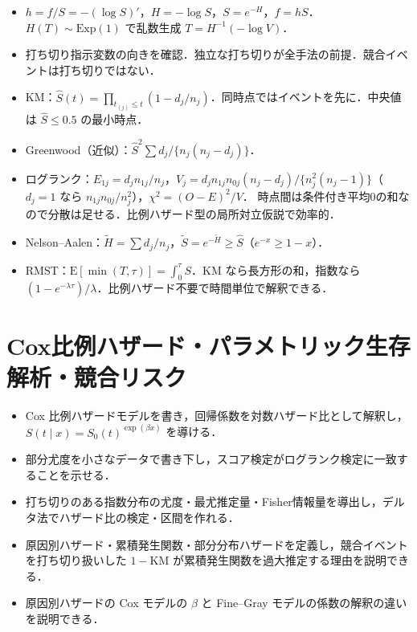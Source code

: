 \documentclass[a4paper,11pt,openany]{ltjsbook}
\newcommand{\E}{\mathrm{E}}
\newcommand{\Ex}{\mathrm{Exp}}
\begin{document}
\begin{summarybox}
\begin{itemize}
\item $h=f/S=-(\log S)'$，$H=-\log S$，$S=e^{-H}$，$f=hS$．$H(T)\sim\Ex(1)$ で乱数生成 $T=H^{-1}(-\log V)$．
\item 打ち切り指示変数の向きを確認．独立な打ち切りが全手法の前提．競合イベントは打ち切りではない．
\item KM：$\hat S(t)=\prod_{t_{(j)}\le t}(1-d_j/n_j)$．同時点ではイベントを先に．中央値は $\hat S\le0.5$ の最小時点．
\item Greenwood（近似）：$\hat S^2\sum d_j/\{n_j(n_j-d_j)\}$．
\item ログランク：$E_{1j}=d_jn_{1j}/n_j$，$V_j=d_jn_{1j}n_{0j}(n_j-d_j)/\{n_j^2(n_j-1)\}$（$d_j=1$ なら $n_{1j}n_{0j}/n_j^2$），$\chi^2=(O-E)^2/V$．
      時点間は条件付き平均0の和なので分散は足せる．比例ハザード型の局所対立仮説で効率的．
\item Nelson--Aalen：$\tilde H=\sum d_j/n_j$，$\tilde S=e^{-\tilde H}\ge\hat S$（$e^{-x}\ge1-x$）．
\item RMST：$\E[\min(T,\tau)]=\int_0^\tau S$．KM なら長方形の和，指数なら $(1-e^{-\lambda\tau})/\lambda$．比例ハザード不要で時間単位で解釈できる．
\end{itemize}
\end{summarybox}

\chapter[Cox比例ハザード・パラメトリック生存解析・競合リスク]{Cox比例ハザード・パラメトリック生存解析・競合リスク}\label{ch:10}

\begin{goalbox}
\begin{itemize}
\item Cox 比例ハザードモデルを書き，回帰係数を対数ハザード比として解釈し，$S(t\mid x)=S_0(t)^{\exp(\beta x)}$ を導ける．
\item 部分尤度を小さなデータで書き下し，スコア検定がログランク検定に一致することを示せる．
\item 打ち切りのある指数分布の尤度・最尤推定量・Fisher情報量を導出し，デルタ法でハザード比の検定・区間を作れる．
\item 原因別ハザード・累積発生関数・部分分布ハザードを定義し，競合イベントを打ち切り扱いした $1-\mathrm{KM}$ が累積発生関数を過大推定する理由を説明できる．
\item 原因別ハザードの Cox モデルの $\beta$ と Fine--Gray モデルの係数の解釈の違いを説明できる．
\end{itemize}
\end{goalbox}
\end{document}
